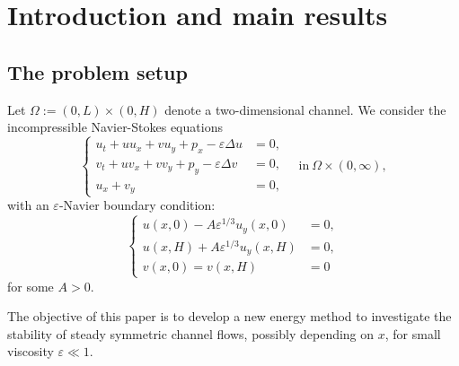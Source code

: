 \documentclass[reqno, 11pt]{amsart}
\theoremstyle{plain}
\theoremstyle{definition}
\theoremstyle{remark}
\numberwithin{equation}{section}
\begin{document}
\section{Introduction and main results}


\subsection{The problem setup}

Let $\Omega := (0,L) \times (0,H)$ denote a two-dimensional channel. We consider the incompressible Navier-Stokes equations
\begin{equation} \label{NS}
\left\{
\begin{aligned}
u_t + u u_x + v u_y + p_x - \varepsilon \Delta u &= 0,\\
v_t + u v_x + v v_y + p_y - \varepsilon \Delta v &= 0,\\
u_x+ v_y &= 0,
\end{aligned}
\right. \quad \mbox{in}~\Omega \times (0,\infty),
\end{equation}
with an $\varepsilon$-Navier boundary condition:
\begin{equation}\label{Navier_boundary_condition_new}
\left\{\begin{aligned}
u(x,0) - A\varepsilon^{1/3} u_y(x,0) &= 0,\\
u(x,H) + A\varepsilon^{1/3} u_y(x,H) &= 0,\\
v(x,0) = v(x,H) &= 0
\end{aligned}
\right.
\end{equation}
for some $A > 0$.

The objective of this paper is to develop a new energy method to investigate the stability of steady symmetric channel flows, possibly depending on $x$, for small viscosity $\varepsilon \ll 1$.
\end{document}
